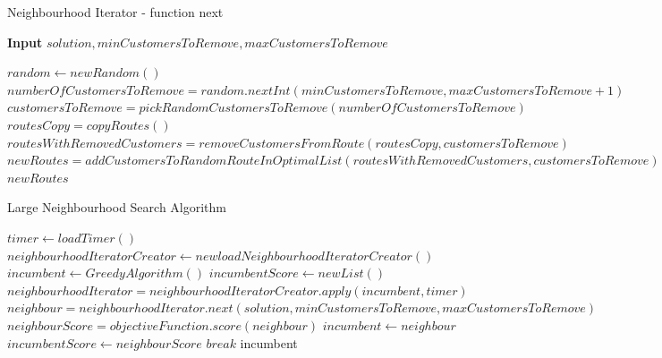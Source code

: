 \documentclass{article}
\begin{document}
\begin{algorithm}
\caption{Neighbourhood Iterator - function next}
\textbf{Input} $solution, minCustomersToRemove, maxCustomersToRemove$
    \begin{algorithmic} 
    \STATE $random \leftarrow new Random()$ 
    \STATE $numberOfCustomersToRemove = random.nextInt(minCustomersToRemove, maxCustomersToRemove + 1)$ 
    \STATE $customersToRemove = pickRandomCustomersToRemove(numberOfCustomersToRemove)$
    \STATE $routesCopy = copyRoutes()$
    \STATE $routesWithRemovedCustomers = removeCustomersFromRoute(routesCopy, customersToRemove)$
    \STATE $newRoutes = addCustomersToRandomRouteInOptimalList(routesWithRemovedCustomers, customersToRemove)$
    \RETURN $newRoutes$
\end{algorithmic}
\end{algorithm}

\begin{algorithm}
\caption{Large Neighbourhood Search Algorithm}
    \begin{algorithmic} 
    \STATE $timer \leftarrow loadTimer()$ 
    \STATE $neighbourhoodIteratorCreator \leftarrow new loadNeighbourhoodIteratorCreator()$ 
    \STATE $incumbent \leftarrow GreedyAlgorithm()$
    \STATE $incumbentScore \leftarrow new List()$
        \STATE $neighbourhoodIterator = neighbourhoodIteratorCreator.apply(incumbent, timer)$
            \STATE $neighbour = neighbourhoodIterator.next(solution, minCustomersToRemove, maxCustomersToRemove)$
            \STATE $neighbourScore = objectiveFunction.score(neighbour)$
                \STATE $incumbent \leftarrow neighbour$
                \STATE $incumbentScore \leftarrow neighbourScore$
                \STATE $break$
            \ENDIF
        \ENDWHILE
    \ENDWHILE
    \RETURN incumbent
\end{algorithmic}
\end{algorithm}

\clearpage
\end{document}
